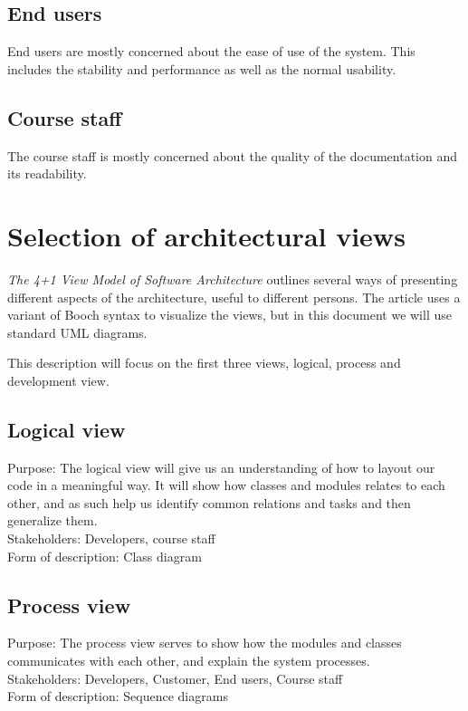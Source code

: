 \documentclass[11pt]{book}
\begin{document}
\subsection{End users}
End users are mostly concerned about the ease of use of the system. This includes the stability and performance as well as the normal usability.

\subsection{Course staff}
The course staff is mostly concerned about the quality of the documentation and its readability.

\section{Selection of architectural views}
\emph{The 4+1 View Model of Software Architecture} \cite{Kruchten:1995:VMA:624610.625529} outlines several ways of presenting different aspects of the architecture, useful to different persons. The article uses a variant of Booch syntax to visualize the views, but in this document we will use standard UML diagrams.

This description will focus on the first three views, logical, process and development view.

\subsection{Logical view}\label{subsec:logicalViewDescription}
Purpose: The logical view will give us an understanding of how to layout our code in a meaningful way. It will show how classes and modules relates to each other, and as such help us identify common relations and tasks and then generalize them.\\
Stakeholders: Developers, course staff\\
Form of description: Class diagram

\subsection{Process view}\label{subsec:processViewDescription}
Purpose: The process view serves to show how the modules and classes communicates with each other, and explain the system processes.\\
Stakeholders: Developers, Customer, End users, Course staff\\
Form of description: Sequence diagrams
\end{document}
